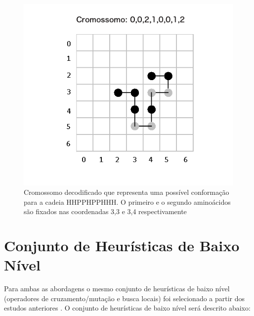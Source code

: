\begin{figure}[!htb]
	\centering
	\includegraphics[scale=0.46]{Imagens/DecodedCromossome.png}
	\caption{Cromossomo decodificado que representa uma possível conformação para a cadeia HHPPHPPHHH. O primeiro e o segundo aminoácidos são fixados nas coordenadas 3,3 e 3,4 respectivamente  }
	\label{img:cromossomo}
\end{figure}


\section{Conjunto de Heurísticas de Baixo Nível}
\label{section:llhset}
Para ambas as abordagens o mesmo conjunto de heurísticas de baixo nível (operadores de cruzamento/mutação e busca locais) foi selecionado a partir dos estudos anteriores \cite{custodio2014multiple, custodio2004investigation, garza2012locality,benitez2015algoritmo}. O conjunto de heurísticas de baixo nível será descrito abaixo:

